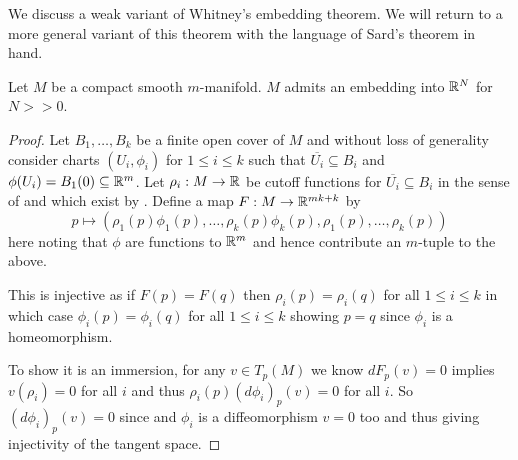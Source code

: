 We discuss a weak variant of Whitney's embedding theorem. We will return to a more general variant of this theorem with the language of Sard's theorem in hand. 
\begin{theorem}\label{thm: Whitney embedding}
    Let $M$ be a compact smooth $m$-manifold. $M$ admits an embedding into $\mathbb{R}^{N}$ for $N>>0$. 
\end{theorem}
\begin{proof}
    Let $B_{1},\dots,B_{k}$ be a finite open cover of $M$ and without loss of generality consider charts $(U_{i},\phi_{i})$ for $1\leq i\leq k$ such that $\overline{U_{i}}\subseteq B_{i}$ and $\phi(U_{i})=B_{1}(0)\subseteq\mathbb{R}^{m}$. Let $\rho_{i}:M\to\mathbb{R}$ be cutoff functions for $\overline{U_{i}}\subseteq B_{i}$ in the sense of  and which exist by . Define a map $F:M\to\mathbb{R}^{mk+k}$ by 
    $$p\mapsto\left(\rho_{1}(p)\phi_{1}(p),\dots,\rho_{k}(p)\phi_{k}(p),\rho_{1}(p),\dots,\rho_{k}(p)\right)$$
    here noting that $\phi$ are functions to $\mathbb{R}^{m}$ and hence contribute an $m$-tuple to the above. 

    This is injective as if $F(p)=F(q)$ then $\rho_{i}(p)=\rho_{i}(q)$ for all $1\leq i\leq k$ in which case $\phi_{i}(p)=\phi_{i}(q)$ for all $1\leq i\leq k$ showing $p=q$ since $\phi_{i}$ is a homeomorphism. 

    To show it is an immersion, for any $v\in T_{p}(M)$ we know $dF_{p}(v)=0$ implies $v(\rho_{i})=0$ for all $i$ and thus $\rho_{i}(p)(d\phi_{i})_{p}(v)=0$ for all $i$. So $(d\phi_{i})_{p}(v)=0$ since and $\phi_{i}$ is a diffeomorphism $v=0$ too and thus giving injectivity of the tangent space. 
\end{proof} 